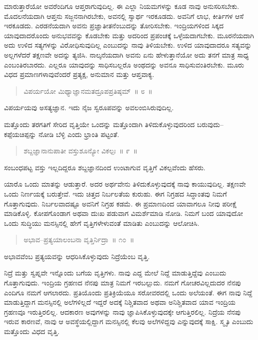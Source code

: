 ಮಾರುತ್ತಾರೆಯೋ ಅವರೆಂದಿಗೂ ಆಪ್ತರಾಗುವುದಿಲ್ಲ. ಈ ಎಲ್ಲಾ ನಿಯಮಗಳನ್ನು ಕೂಡ ನಾವು ಅನುಸರಿಸಬೇಕು. ಮೊದಲನೆಯದಾಗಿ ಆಪ್ತನು ಸಜ್ಜನನಾಗಿರಬೇಕು, ಅವನಲ್ಲಿ ಸ್ವಾರ್ಥ ಇರಕೂಡದು. ಅವನಿಗೆ ಲಾಭ, ಕೀರ್ತಿಗಳ ಆಸೆ ಇರಕೂಡದು. ಎರಡನೆಯದಾಗಿ ಅವನು ಪ್ರಜ್ಞಾತೀತನೆಂಬುದನ್ನು ತೋರಿಸಬೇಕು. ಇಂದ್ರಿಯಗಳಿಂದ ಸಿಕ್ಕದ ಯಾವುದಾದರೊಂದು ಅನುಭವವನ್ನು ಕೊಡಬೇಕು ಮತ್ತು ಅದರಿಂದ ಪ್ರಪಂಚಕ್ಕೆ ಒಳ್ಳೆಯದಾಗಬೇಕು. ಮೂರನೆಯದಾಗಿ ಅದು ಉಳಿದ ಸತ್ಯಗಳನ್ನು ವಿರೋಧಿಸುವುದಿಲ್ಲ ಎಂಬುದನ್ನು ನಾವು ತಿಳಿಯಬೇಕು. ಉಳಿದ ಯಾವುದಾದರೂ ಸತ್ಯವನ್ನು ಅಲ್ಲಗಳೆದರೆ ತಕ್ಷಣವೇ ಅದನ್ನು ತ್ಯಜಿಸಿ. ನಾಲ್ಕನೆಯದಾಗಿ ಅವನು ಏನು ಹೇಳುತ್ತಾನೆಯೋ ಅದು ತನಗೆ ಮಾತ್ರ ಸಾಧ್ಯ ಎಂಬಂತಿರಬಾರದು. ಎಲ್ಲರೂ ಯಾವುದನ್ನು ಸಾಧಿಸಬಲ್ಲರೊ ಅಂಥದನ್ನು ಅವನೂ ಸಾಧಿಸುವಂತಿರಬೇಕು. ಮೂರು ವಿಧದ ಪ್ರಮಾಣಗಳಾವುವೆಂದರೆ ಪ್ರತ್ಯಕ್ಷ, ಅನುಮಾನ ಮತ್ತು ಆಪ್ತವಾಕ್ಯ.

\begin{verse}
ವಿಪರ್ಯಯೋ ಮಿಥ್ಯಾಜ್ಞಾನಮತದ್ರೂಪಪ್ರತಿಷ್ಠಮ್​~॥ ೮~॥
\end{verse}

ವಿಪರ್ಯಯವು ಅಸತ್ಯಜ್ಞಾನ. ಇದು ನೈಜ ಸ್ವರೂಪವನ್ನು ಅವಲಂಬಿಸಿರುವುದಿಲ್ಲ. 

ಮತ್ತೊಂದು ತರಗತಿಗೆ ಸೇರಿದ ವೃತ್ತಿಯೇ ಒಂದನ್ನು ಮತ್ತೊಂದಾಗಿ ತಿಳಿದುಕೊಳ್ಳುವುದರಿಂದ ಬರುವುದು–ಕಪ್ಪೆಯಚಿಪ್ಪನ್ನು ನೋಡಿ ಬೆಳ್ಳಿ ಎಂದು ಭ್ರಾಂತಿ ಪಟ್ಟಂತೆ.

\begin{verse}
ಶಬ್ದಜ್ಞಾನಾನುಪಾತೀ ವಸ್ತುಶೂನ್ಯೋ ವಿಕಲ್ಪಃ~॥ ೯~॥
\end{verse}


ಸಂಬಂಧಪಟ್ಟ ವಸ್ತು ಇಲ್ಲದಿದ್ದರೂ ಶಬ್ದಜ್ಞಾನದಿಂದ ಉಂಟಾಗುವ ವೃತ್ತಿಗೆ ವಿಕಲ್ಪವೆಂದು ಹೆಸರು. 

ಯಾರೊ ಒಂದು ಮಾತನ್ನು ಆಡುತ್ತಾರೆ. ಅದರ ಅರ್ಥವೇನು ತಿಳಿದುಕೊಳ್ಳುವುದಕ್ಕೆ ನಾವು ಕಾಯುವುದಿಲ್ಲ. ತಕ್ಷಣವೇ ಒಂದು ನಿರ್ಣಯಕ್ಕೆ ಬರುತ್ತೇವೆ. ಇದು ಚಿತ್ತದ ನಿರ್ಬಲತೆಯ ಕುರುಹು. ಈಗ ನಿಗ್ರಹದ ಸಿದ್ಧಾಂತವು ನಿಮಗೆ ಗೊತ್ತಾಗುವುದು. ನಿರ್ಬಲವಾದಷ್ಟೂ ಅವನಿಗೆ ನಿಗ್ರಹ ಕಡಮೆ. ಈ ಪ್ರಮಾಣದಿಂದ ಯಾವಾಗಲೂ ನೀವು ಪರೀಕ್ಷೆ ಮಾಡಿಕೊಳ್ಳಿ. ಕೋಪಗೊಂಡಾಗ ಅಥವಾ ದುಃಖ ಪಡುವಾಗ ವಿಮರ್ಶೆಮಾಡಿ ನೋಡಿ. ನಿಮಗೆ ಬಂದ ಯಾವುದೋ ಒಂದು ಸುದ್ಧಿಯು ಮನಸ್ಸಿನಲ್ಲಿ ಹೇಗೆ ವೃತ್ತಿಗಳೇಳುವಂತೆ ಮಾಡಿತು ಎಂಬುದನ್ನು ಆಲೋಚಿಸಿ.

\begin{verse}
ಅಭಾವ–ಪ್ರತ್ಯಯಾಲಂಬನಾ ವೃತ್ತಿರ್ನಿದ್ರಾ~॥ ೧೦~॥
\end{verse}

\vspace{-0.2cm}

ಅಭಾವವೆಂಬ ಪ್ರತ್ಯಯವನ್ನು ಆಧರಿಸಿಕೊಳ್ಳುವುದು ನಿದ್ರೆಯೆಂಬ ವೃತ್ತಿ. 

ನಿದ್ರೆ ಮತ್ತು ಸ್ವಪ್ನವೇ ಇನ್ನೊಂದು ಬಗೆಯ ವೃತ್ತಿಗಳು. ನಾವು ಎದ್ದ ಮೇಲೆ ನಿದ್ದೆ ಮಾಡುತ್ತಿದ್ದೆವು ಎಂಬುದು ಗೊತ್ತಾಗುವುದು. ಇಂದ್ರಿಯ ಗ್ರಹಣದ ನೆನಪು ಮಾತ್ರ ನಿಮಗೆ ಇರಬಲ್ಲುದು. ನಮಗೆ ಗೋಚರವಿಲ್ಲದುದರ ನೆನಪು ಎಂದಿಗೂ ನಮಗೆ ಆಗಲಾರದು. ಪ್ರತಿಯೊಂದು ಪ್ರತಿಕ್ರಿಯೆಯೂ ಸರೋವರದಲ್ಲಿ ಒಂದು ಅಲೆಯಂತೆ. ಈಗ ನಾವು ನಿದ್ದೆ ಮಾಡುತ್ತಿದ್ದಾಗ ಮನಸ್ಸಿನಲ್ಲಿ ಅಲೆಗಳಿಲ್ಲದೆ ಇದ್ದರೆ ಅದಕ್ಕೆ ನಿಶ್ಚಿತವಾದ ಅಥವಾ ಅನಿಶ್ಚಿತವಾದ ಯಾವ ಇಂದ್ರಿಯ ಗ್ರಹಣವೂ ಇರುತ್ತಿರಲಿಲ್ಲ. ಆದಕಾರಣ ಅವುಗಳನ್ನು ನಾವು ಜ್ಞಾಪಿಸಿಕೊಳ್ಳುವುದಕ್ಕೇ ಆಗುತ್ತಿರಲಿಲ್ಲ. ನಿದ್ರೆಯ ನೆನಪು ಇರುವ ಕಾರಣವೆ, ನಾವು ಆ ಅವಸ್ಥೆಯಲ್ಲಿದ್ದಾಗ ಮನಸ್ಸಿನಲ್ಲಿ ಕೆಲವು ಅಲೆಗಳಿದ್ದವು ಎನ್ನುವುದಕ್ಕೆ ಸಾಕ್ಷಿ. ಸ್ಮೃತಿ ಎಂಬುದು ಮತ್ತೊಂದು ವಿಧದ ವೃತ್ತಿ. 

